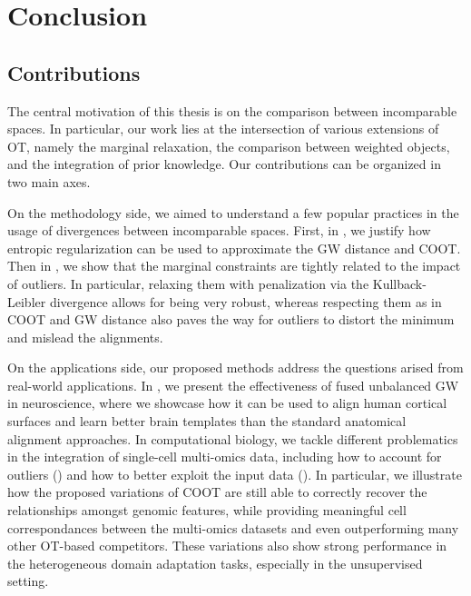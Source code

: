 \chapter[Conclusion]{Conclusion}


\renewcommand{\contentsname}{Contents}
\localtableofcontents*
{}

\section{Contributions}

The central motivation of this thesis is on the comparison between incomparable spaces.
In particular, our work lies at the intersection of various extensions of OT,
namely the marginal relaxation, the comparison between weighted objects,
and the integration of prior knowledge. Our contributions can be organized in two main axes.

On the methodology side, we aimed to understand a few popular practices in the usage of
divergences between incomparable spaces. First, in ,
we justify how entropic regularization can be used to approximate the GW distance and COOT.
Then in ,
we show that the marginal constraints are tightly related to the impact of outliers. In particular,
relaxing them with penalization via the Kullback-Leibler divergence allows for being very robust,
whereas respecting them as in COOT and GW distance also paves the way for outliers to distort the
minimum and mislead the alignments.

On the applications side, our proposed methods address the questions arised from real-world
applications. In , we present the effectiveness of fused unbalanced GW in neuroscience,
where we showcase how it can be used to align human cortical surfaces and
learn better brain templates than the standard anatomical alignment approaches.
In computational biology, we tackle different problematics in the integration of
single-cell multi-omics data, including how to account for outliers ()
and how to better exploit the input data ().
In particular, we illustrate how the proposed variations of COOT are still able to correctly recover
the relationships amongst genomic features, while providing meaningful
cell correspondances between the multi-omics datasets and even outperforming
many other OT-based competitors. These variations also show strong performance in the
heterogeneous domain adaptation tasks, especially in the unsupervised setting.

